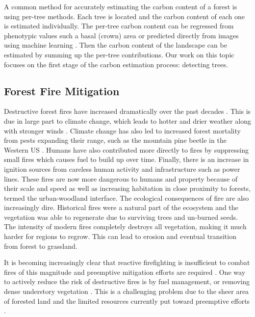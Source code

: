 A common method for accurately estimating the carbon content of a forest is using per-tree methods. Each tree is located and the carbon content of each one is estimated individually. The per-tree carbon content can be regressed from phenotypic values such a basal (crown) area \cite{Torres2013UsingMexico} or predicted directly from images using machine learning \cite{Reiersen2022ReforesTree:Imagery}. Then the carbon content of the landscape can be estimated by summing up the per-tree contributions. Our work on this topic focuses on the first stage of the carbon estimation process: detecting trees.

\subsection{Forest Fire Mitigation} 
Destructive forest fires have increased dramatically over the past decades \cite{spreading_like_wildfire, ayanz2021, nfn2022}. This is due in large part to climate change, which leads to hotter and drier weather along with stronger winds \cite{spreading_like_wildfire}. Climate change has also led to increased forest mortality from pests expanding their range, such as the mountain pine beetle in the Western US \cite{Jenkins2014AndFuels}. Humans have also contributed more directly to fires by suppressing small fires which causes fuel to build up over time. Finally, there is an increase in ignition sources from careless human activity and infrastructure such as power lines. These fires are now more dangerous to humans and property because of their scale and speed as well as increasing habitation in close proximity to forests, termed the urban-woodland interface. The ecological consequences of fire are also increasingly dire. Historical fires were a natural part of the ecosystem and the vegetation was able to regenerate due to surviving trees and un-burned seeds. The intensity of modern fires completely destroys all vegetation, making it much harder for regions to regrow. This can lead to erosion and eventual transition from forest to grassland.

It is becoming increasingly clear that reactive firefighting is insufficient to combat fires of this magnitude and preemptive mitigation efforts are required \cite{spreading_like_wildfire}. One way to actively reduce the risk of destructive fires is by fuel management, or removing dense understory vegetation \cite{Fire2021FuelsManagement, WildlandFireResiliencyProgram20214Plan, Agriculture2019HazardousComplex}. This is a challenging problem due to the sheer area of forested land and the limited resources currently put toward preemptive efforts \cite{spreading_like_wildfire}.

